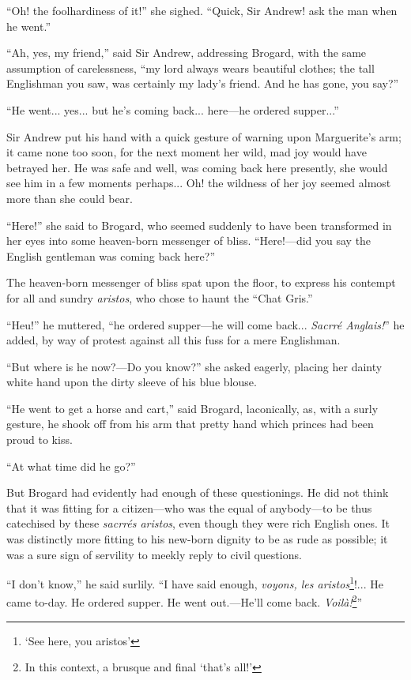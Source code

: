 \documentclass[paper=5.5in:8.5in,BCOR=7mm,twoside,DIV=calc,12pt,usegeometry,chapterprefix,endperiod,headings=big]{scrbook}
\begin{document}
\enquote{Oh! the foolhardiness of it!} she sighed. \enquote{Quick, Sir Andrew! ask the man when he went.}

\enquote{Ah, yes, my friend,} said Sir Andrew, addressing Brogard, with the same assumption of carelessness, \enquote{my lord always wears beautiful clothes; the tall Englishman you saw, was certainly my lady's friend. And he has gone, you say?}

\enquote{He went... yes... but he's coming back... here---he ordered supper...}

Sir Andrew put his hand with a quick gesture of warning upon Marguerite's arm; it came none too soon, for the next moment her wild, mad joy would have betrayed her. He was safe and well, was coming back here presently, she would see him in a few moments perhaps... Oh! the wildness of her joy seemed almost more than she could bear.

\enquote{Here!} she said to Brogard, who seemed suddenly to have been transformed in her eyes into some heaven-born messenger of bliss. \enquote{Here!---did you say the English gentleman was coming back here?}

The heaven-born messenger of bliss spat upon the floor, to express his contempt for all and sundry \textit{aristos}, who chose to haunt the \enquote{Chat Gris.}

\enquote{Heu!} he muttered, \enquote{he ordered supper---he will come back... \textit{Sacrré Anglais!}} he added, by way of protest against all this fuss for a mere Englishman.

\enquote{But where is he now?---Do you know?} she asked eagerly, placing her dainty white hand upon the dirty sleeve of his blue blouse.

\enquote{He went to get a horse and cart,} said Brogard, laconically, as, with a surly gesture, he shook off from his arm that pretty hand which princes had been proud to kiss.

\enquote{At what time did he go?}

But Brogard had evidently had enough of these questionings. He did not think that it was fitting for a citizen---who was the equal of anybody---to be thus catechised by these \textit{sacrrés aristos}, even though they were rich English ones. It was distinctly more fitting to his new-born dignity to be as rude as possible; it was a sure sign of servility to meekly reply to civil questions.

\enquote{I don't know,} he said surlily. \enquote{I have said enough, \textit{voyons, les aristos}\footnote{\enquote{See here, you aristos}}!... He came to-day. He ordered supper. He went out.---He'll come back. \textit{Voilà!}\footnote{In this context, a brusque and final \enquote{that's all!}}}
\end{document}
